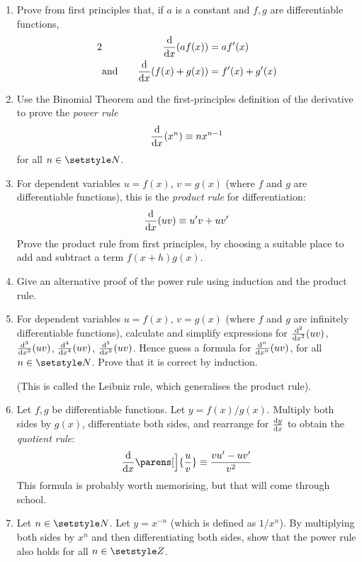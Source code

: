 \begin{enumerate}
 \item
 Prove from first principles that, if
  \(a\) is a constant and \(f, g\) are differentiable functions,
  \begin{alignat*}2
   && \dv{x}(af(x)) &= af'(x) \\
   &\text{and}\quad&\dv{x}(f(x) + g(x)) &= f'(x) + g'(x)
  \end{alignat*}
 \item
  Use the Binomial Theorem and the first-principles definition of the derivative
  to prove the \emph{power rule}
  \begin{equation*}
   \dv{x}(x^n) \equiv nx^{n - 1}
  \end{equation*}
  for all \(n \in \Naturals\).
 \item
  For dependent variables \(u = f(x)\), \(v = g(x)\) (where \(f\) and \(g\) are
  differentiable functions), this is the
  \emph{product rule} for differentiation:
  \begin{equation*}
   \dv{x}(uv) \equiv u'v + uv'
  \end{equation*}
  Prove the product rule from first principles, by choosing a suitable place to
  add and subtract a term \(f(x + h)g(x)\).
 \item
  Give an alternative proof of the power rule using induction and the product
  rule.
 \item
  For dependent variables \(u = f(x)\), \(v = g(x)\) (where \(f\) and \(g\) are
  infinitely differentiable functions), calculate and simplify expressions for
  \(\dv[2]{x}(uv)\), \(\dv[3]{x}(uv)\), \(\dv[4]{x}(uv)\), \(\dv[5]{x}(uv)\).
  Hence guess a formula for \(\dv[n]{x}(uv)\), for all \(n \in \Naturals\).
  Prove that it is correct by induction.

  (This is called the Leibniz rule, which generalises the product rule).
 \item
  Let \(f, g\) be differentiable functions. Let \(y = f(x) / g(x)\). Multiply
  both sides by \(g(x)\), differentiate both sides, and rearrange for
  \(\dv<y>{x}\) to obtain the \emph{quotient rule}:
  \begin{equation*}
   \dv{x}\parens[\Big]{\frac uv}
    \equiv \frac{vu' - uv'}{v^2}
  \end{equation*}
  This formula is probably worth memorising, but that will come through school.
 \item
  Let \(n \in \Naturals\). Let \(y = x^{-n}\) (which is defined as \(1 / x^n\)).
  By multiplying both sides by \(x^n\) and then differentiating both sides, show
  that the power rule also holds for all \(n \in \Integers\).


\end{enumerate}

